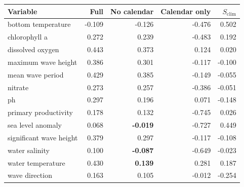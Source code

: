 \begin{tabular}{l rrr r}
\toprule
Variable & Full & No calendar & Calendar only & $S_{\mathrm{clim}}$ \\
\midrule
bottom temperature & -0.109 & -0.126 & -0.476 & 0.502 \\
chlorophyll a & 0.272 & 0.239 & -0.483 & 0.192 \\
dissolved oxygen & 0.443 & 0.373 & 0.124 & 0.020 \\
maximum wave height & 0.386 & 0.301 & -0.117 & -0.100 \\
mean wave period & 0.429 & 0.385 & -0.149 & -0.055 \\
nitrate & 0.273 & 0.257 & -0.386 & -0.051 \\
ph & 0.297 & 0.196 & 0.071 & -0.148 \\
primary productivity & 0.178 & 0.132 & -0.745 & 0.026 \\
sea level anomaly & 0.068 & \textbf{-0.019} & -0.727 & 0.449 \\
significant wave height & 0.379 & 0.297 & -0.117 & -0.108 \\
water salinity & 0.100 & \textbf{-0.087} & -0.649 & -0.023 \\
water temperature & 0.430 & \textbf{0.139} & 0.281 & 0.187 \\
wave direction & 0.163 & 0.105 & -0.012 & -0.254 \\
\bottomrule
\end{tabular}